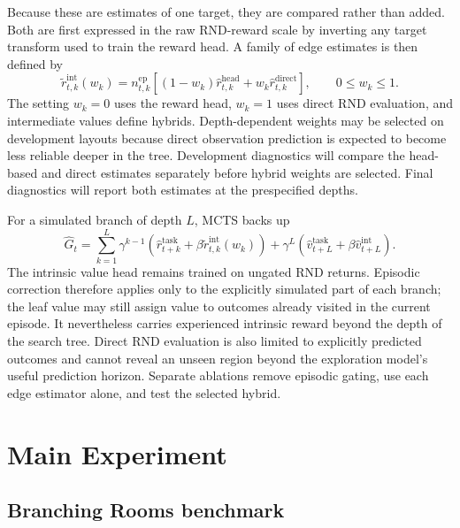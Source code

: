 \documentclass{article}
\begin{document}
Because these are estimates of one target, they are compared rather than added.
Both are first expressed in the raw RND-reward scale by inverting any target
transform used to train the reward head. A family of edge estimates is then
defined by
\begin{equation}
    \tilde r^{\mathrm{int}}_{t,k}(w_k)
      =n^{\mathrm{ep}}_{t,k}
       \left[(1-w_k)\hat r^{\mathrm{head}}_{t,k}
             +w_k\hat r^{\mathrm{direct}}_{t,k}\right],
    \qquad 0\leq w_k\leq1.
\end{equation}
The setting $w_k=0$ uses the reward head, $w_k=1$ uses direct RND evaluation,
and intermediate values define hybrids. Depth-dependent weights may be selected
on development layouts because direct observation prediction is expected to
become less reliable deeper in the tree. Development diagnostics will compare
the head-based and direct estimates separately before hybrid weights are
selected. Final diagnostics will report both estimates at the prespecified
depths.

For a simulated branch of depth $L$, MCTS backs up
\begin{equation}
    \hat G_t
      =\sum_{k=1}^{L}\gamma^{k-1}
       \left(
       \hat r^{\mathrm{task}}_{t+k}
       +\beta\tilde r^{\mathrm{int}}_{t,k}(w_k)
       \right)
       +\gamma^L\left(
       \hat v^{\mathrm{task}}_{t+L}
       +\beta\hat v^{\mathrm{int}}_{t+L}
       \right).
\end{equation}
The intrinsic value head remains trained on ungated RND returns. Episodic
correction therefore applies only to the explicitly simulated part of each
branch; the leaf value may still assign value to outcomes already visited in
the current episode. It nevertheless carries experienced intrinsic reward
beyond the depth of the search tree. Direct RND evaluation is also limited to
explicitly predicted outcomes and cannot reveal an unseen region beyond the
exploration model's useful prediction horizon. Separate ablations remove
episodic gating, use each edge estimator alone, and test the selected hybrid.

\section{Main Experiment}

\subsection{Branching Rooms benchmark}
\end{document}
